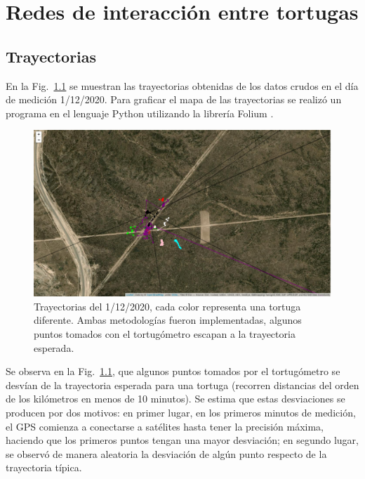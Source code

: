 \chapter{Redes de interacción entre tortugas}
\graphicspath{{figs/}}
 
 
\label{Redes de interacción entre tortugas}
\section{Trayectorias }
 
En la Fig.~\ref{fig:trayeSinFiltr} se muestran las trayectorias obtenidas de los datos crudos en el día de medición 1/12/2020. Para graficar el mapa de las trayectorias se realizó un programa en el lenguaje Python utilizando la librería Folium \cite{github}.
 
\begin{figure}[ht]
    \begin{center}
       
   
    \includegraphics[width=\imsize]{Chap2/Traye1_12_sinF.png}
\end{center}
    \caption[Trayectorias un dia de medición, sin filtrar.]{Trayectorias del 1/12/2020, cada color representa una tortuga diferente. Ambas metodologías fueron implementadas, algunos puntos tomados con el tortugómetro escapan a la trayectoria esperada.}
    \label{fig:trayeSinFiltr}
\end{figure}
Se observa en la Fig.~\ref{fig:trayeSinFiltr}, que algunos puntos tomados por el tortugómetro se desvían de la trayectoria esperada para una tortuga (recorren distancias del orden de los kilómetros en menos de 10 minutos). Se estima que estas desviaciones se producen por dos motivos: en primer lugar, en los primeros minutos de medición, el GPS comienza a conectarse a satélites hasta tener la precisión máxima, haciendo que  los primeros puntos tengan una mayor desviación; en segundo lugar, se observó de manera aleatoria la desviación de algún punto respecto de la trayectoria típica.
 
